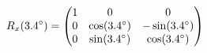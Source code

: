 \documentclass[preview]{standalone}
\begin{document}
\begin{align*}
\special{dvisvgm:raw <g id='unique000'>}R_x(3.4^\circ) = \begin{pmatrix} 1 & 0 & 0 \\ 0 & \cos(3.4^\circ) & -\sin(3.4^\circ) \\ 0 & \sin(3.4^\circ) & \cos(3.4^\circ) \end{pmatrix}\special{dvisvgm:raw </g>}
\end{align*}
\end{document}
